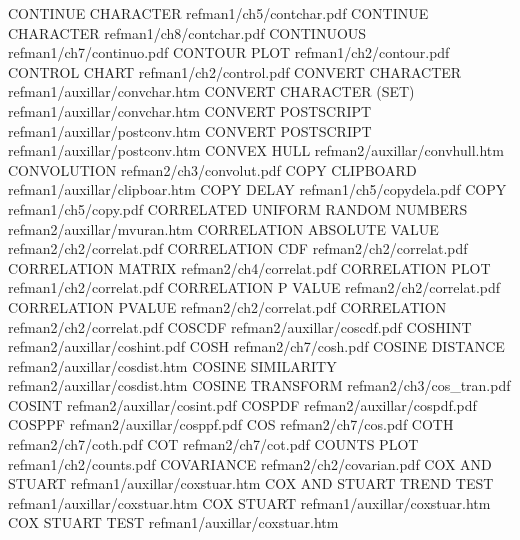 CONTINUE CHARACTER                      refman1/ch5/contchar.pdf
CONTINUE CHARACTER                      refman1/ch8/contchar.pdf
CONTINUOUS                              refman1/ch7/continuo.pdf
CONTOUR PLOT                            refman1/ch2/contour.pdf
CONTROL CHART                           refman1/ch2/control.pdf
CONVERT CHARACTER                       refman1/auxillar/convchar.htm
CONVERT CHARACTER (SET)                 refman1/auxillar/convchar.htm
CONVERT POSTSCRIPT                      refman1/auxillar/postconv.htm
CONVERT POSTSCRIPT                      refman1/auxillar/postconv.htm
CONVEX HULL                             refman2/auxillar/convhull.htm
CONVOLUTION                             refman2/ch3/convolut.pdf
COPY CLIPBOARD                          refman1/auxillar/clipboar.htm
COPY DELAY                              refman1/ch5/copydela.pdf
COPY                                    refman1/ch5/copy.pdf
CORRELATED UNIFORM RANDOM NUMBERS       refman2/auxillar/mvuran.htm
CORRELATION ABSOLUTE VALUE              refman2/ch2/correlat.pdf
CORRELATION CDF                         refman2/ch2/correlat.pdf
CORRELATION MATRIX                      refman2/ch4/correlat.pdf
CORRELATION PLOT                        refman1/ch2/correlat.pdf
CORRELATION P VALUE                     refman2/ch2/correlat.pdf
CORRELATION PVALUE                      refman2/ch2/correlat.pdf
CORRELATION                             refman2/ch2/correlat.pdf
COSCDF                                  refman2/auxillar/coscdf.pdf
COSHINT                                 refman2/auxillar/coshint.pdf
COSH                                    refman2/ch7/cosh.pdf
COSINE DISTANCE                         refman2/auxillar/cosdist.htm
COSINE SIMILARITY                       refman2/auxillar/cosdist.htm
COSINE TRANSFORM                        refman2/ch3/cos_tran.pdf
COSINT                                  refman2/auxillar/cosint.pdf
COSPDF                                  refman2/auxillar/cospdf.pdf
COSPPF                                  refman2/auxillar/cosppf.pdf
COS                                     refman2/ch7/cos.pdf
COTH                                    refman2/ch7/coth.pdf
COT                                     refman2/ch7/cot.pdf
COUNTS PLOT                             refman1/ch2/counts.pdf
COVARIANCE                              refman2/ch2/covarian.pdf
COX AND STUART                          refman1/auxillar/coxstuar.htm
COX AND STUART TREND TEST               refman1/auxillar/coxstuar.htm
COX STUART                              refman1/auxillar/coxstuar.htm
COX STUART TEST                         refman1/auxillar/coxstuar.htm
